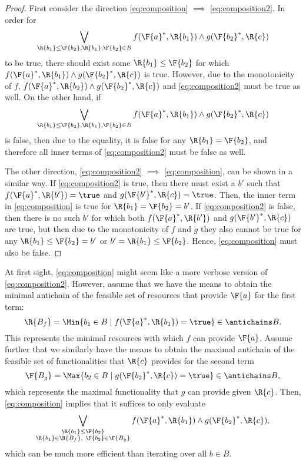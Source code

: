 \begin{proof}
First consider the direction \cref{eq:composition} $\implies$ \cref{eq:composition2}. In order for 
\begin{equation}
    \bigvee_{\R{b_1}\leq\F{b_2}, \R{b_1},\F{b_2}\in B} f(\F{a}^*,\R{b_1}) \wedge g(\F{b_2}^*,\R{c})
\end{equation} to be true, there should exist some $\R{b_1}\leq \F{b_2}$ for which $f(\F{a}^*,\R{b_1}) \wedge g(\F{b_2}^*,\R{c})$ is true. However, due to the monotonicity of $f$, $f(\F{a}^*,\R{b_2}) \wedge g(\F{b_2}^*,\R{c})$ and \cref{eq:composition2} must be true as well. On the other hand, if
\begin{equation}
    \bigvee_{\R{b_1}\leq\F{b_2}, \R{b_1},\F{b_2}\in B} f(\F{a}^*,\R{b_1}) \wedge g(\F{b_2}^*,\R{c})
\end{equation} is false, then due to the equality, it is false for any $\R{b_1}=\F{b_2}$, and therefore all inner terms of \cref{eq:composition2} must be false as well.

The other direction, \cref{eq:composition2} $\implies$ \cref{eq:composition}, can be shown in a similar way. If \cref{eq:composition2} is true, then there must exist a $b'$ such that $f(\F{a}^*, \R{b'})=\true$ and $g(\F{b'}^*, \R{c})=\true$. Then, the inner term in \cref{eq:composition} is true for $\R{b_1}=\F{b_2}=b'$. If \cref{eq:composition2} is false, then there is no such $b'$ for which both $f(\F{a}^*, \R{b'})$ and $g(\F{b'}^*, \R{c})$ are true, but then due to the monotonicity of $f$ and $g$ they also cannot be true for any $\R{b_1} \leq \F{b_2} = b'$ or $b'=\R{b_1} \leq \F{b_2}$. Hence, \cref{eq:composition} must also be false.
\end{proof}
\begin{remark}
At first sight, \cref{eq:composition} might seem like a more verbose version of \cref{eq:composition2}. However, assume that we have the means to obtain the minimal antichain of the feasible set of resources that provide $\F{a}$ for the first term:
\begin{equation}
    \R{B_f} = \Min \{b_1\in B \mid f(\F{a}^*,\R{b_1})=\true\} \in \antichains B.
\end{equation}
This represents the minimal resources with which $f$ can provide $\F{a}$. Assume further that we similarly have the means to obtain the maximal antichain of the feasible set of functionalities that $\R{c}$ provides for the second term
\begin{equation}
    \F{B_g} = \Max \{b_2\in B \mid g(\F{b_2}^*,\R{c})=\true\} \in \antichains B,
\end{equation}
which represents the maximal functionality that $g$ can provide given $\R{c}$. Then, \cref{eq:composition} implies that it suffices to only evaluate
\begin{equation}
    \bigvee_{\substack{\R{b_1}\leq\F{b_2} \\ \R{b_1}\in \R{B_f},~ \F{b_2}\in\F{B_g} }} f(\F{a}^*,\R{b_1}) \wedge g(\F{b_2}^*,\R{c}),
\end{equation}
which can be much more efficient than iterating over all $b\in B$.
\end{remark}


